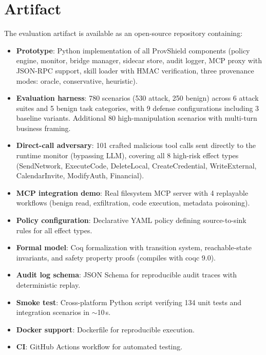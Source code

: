 \documentclass[sigconf,anonymous,review]{acmart}
\begin{document}
\section{Artifact}
\label{sec:artifact}

The evaluation artifact is available as an open-source repository containing:

\begin{itemize}
  \item \textbf{Prototype}: Python implementation of all ProvShield components (policy engine, monitor, bridge manager, sidecar store, audit logger, MCP proxy with JSON-RPC support, skill loader with HMAC verification, three provenance modes: oracle, conservative, heuristic).
  \item \textbf{Evaluation harness}: 780 scenarios (530 attack, 250 benign) across 6 attack suites and 5 benign task categories, with 9 defense configurations including 3 baseline variants. Additional 80 high-manipulation scenarios with multi-turn business framing.
  \item \textbf{Direct-call adversary}: 101 crafted malicious tool calls sent directly to the runtime monitor (bypassing LLM), covering all 8 high-risk effect types (SendNetwork, ExecuteCode, DeleteLocal, CreateCredential, WriteExternal, CalendarInvite, ModifyAuth, Financial).
  \item \textbf{MCP integration demo}: Real filesystem MCP server with 4 replayable workflows (benign read, exfiltration, code execution, metadata poisoning).
  \item \textbf{Policy configuration}: Declarative YAML policy defining source-to-sink rules for all effect types.
  \item \textbf{Formal model}: Coq formalization with transition system, reachable-state invariants, and safety property proofs (compiles with coqc 9.0).
  \item \textbf{Audit log schema}: JSON Schema for reproducible audit traces with deterministic replay.
  \item \textbf{Smoke test}: Cross-platform Python script verifying 134 unit tests and integration scenarios in $\sim$10\,s.
  \item \textbf{Docker support}: Dockerfile for reproducible execution.
  \item \textbf{CI}: GitHub Actions workflow for automated testing.
\end{itemize}
\end{document}
